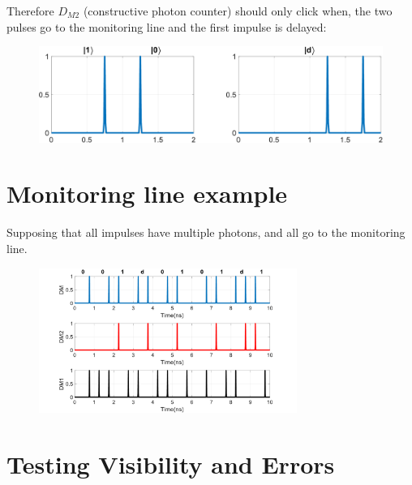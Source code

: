 \documentclass[1000pt]{article}
\newcommand{\mysection}[1]{\section*{\color{black}\sffamily #1}}%
\begin{document}
Therefore $D_{M2}$ (constructive photon counter) should only click when, the two pulses go to the monitoring line and the first impulse is delayed:
\vspace*{0.5cm}
    \begin{figure}[hbt]
    	\centering
    	\includegraphics[width=1\textwidth]{./figures/S2.pdf}
    \end{figure}

\mysection{\Huge\textbf{Monitoring line example}} \Large \vspace*{1cm}

Supposing that all impulses have multiple photons, and all go to the monitoring line.

  \begin{figure}[hbt]
    	\centering
    	\includegraphics[width=0.75\textwidth]{./figures/DM3.pdf}
    \end{figure}


\mysection{\Huge\textbf{Testing Visibility and Errors}} \Large \vspace*{1cm}
\end{document}
